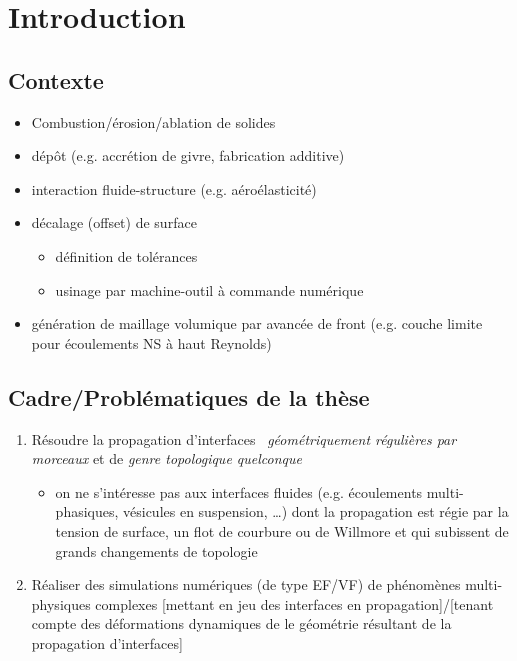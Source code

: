 \chapter*{Introduction}


\section*{Contexte}
\begin{itemize}
	\item Combustion/érosion/ablation de solides
	\item dépôt (e.g. accrétion de givre, fabrication additive)
	\item interaction fluide-structure (e.g. aéroélasticité)
	\item décalage (offset) de surface
	\begin{itemize}
		\item définition de tolérances
		\item usinage par machine-outil à commande numérique
	\end{itemize}	 
	\item génération de maillage volumique par avancée de front (e.g. couche limite pour écoulements NS à haut Reynolds)
\end{itemize}

\section*{Cadre/Problématiques de la thèse}
\begin{enumerate}
	\item Résoudre la propagation d'interfaces \troisD\ \emph{géométriquement régulières par morceaux} et de \emph{genre topologique quelconque} 
	\begin{itemize}
		\item on ne s'intéresse pas aux interfaces fluides (e.g. écoulements multi-phasiques, vésicules en suspension, …) dont la propagation est régie par la tension de surface, un flot de courbure ou de Willmore et qui subissent de grands changements de topologie
	\end{itemize}
	
	\item Réaliser des simulations numériques (de type EF/VF) de phénomènes multi-physiques complexes [mettant en jeu des interfaces en propagation]/[tenant compte des déformations dynamiques de le géométrie résultant de la propagation d'interfaces]
\end{enumerate}



